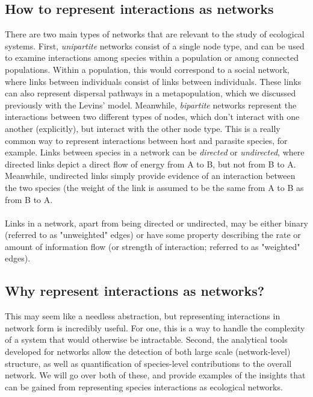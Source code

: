 \documentclass[12pt]{article}
\begin{document}
\bigskip

\subsection*{How to represent interactions as networks}

There are two main types of networks that are relevant to the study of ecological systems. First, \textit{unipartite} networks consist of a single node type, and can be used to examine interactions among species within a population or among connected populations. Within a population, this would correspond to a social network, where links between individuals consist of links between individuals. These links can also represent dispersal pathways in a metapopulation, which we discussed previously with the Levins' model. Meanwhile, \textit{bipartite} networks represent the interactions between two different types of nodes, which don't interact with one another (explicitly), but interact with the other node type. This is a really common way to represent interactions between host and parasite species, for example. Links between species in a network can be \textit{directed} or \textit{undirected}, where directed links depict a direct flow of energy from A to B, but not from B to A. Meanwhile, undirected links simply provide evidence of an interaction between the two species (the weight of the link is assumed to be the same from A to B as from B to A. 


\paragraph*{}
Links in a network, apart from being directed or undirected, may be either binary (referred to as "unweighted" edges) or have some property describing the rate or amount of information flow (or strength of interaction; referred to as "weighted" edges).










\bigskip
\subsection*{Why represent interactions as networks?}

This may seem like a needless abstraction, but representing interactions in network form is incredibly useful. For one, this is a way to handle the complexity of a system that would otherwise be intractable. Second, the analytical tools developed for networks allow the detection of both large scale (network-level) structure, as well as quantification of species-level contributions to the overall network. We will go over both of these, and provide examples of the insights that can be gained from representing species interactions as ecological networks. 
\end{document}
